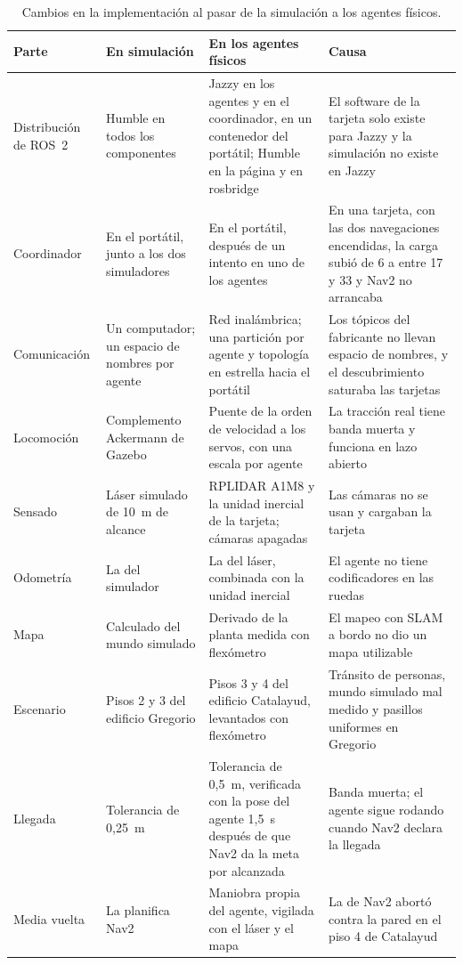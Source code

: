 \begin{table}[H]
  \centering\footnotesize
  \caption{Cambios en la implementación al pasar de la simulación a los agentes físicos.}
  \label{tab:sim-vehiculos}
  \begin{tabular}{@{}p{}p{}p{}p{}@{}}
    \toprule
    \textbf{Parte} & \textbf{En simulación} & \textbf{En los agentes físicos} & \textbf{Causa} \\ \midrule
    Distribución de ROS~2 & Humble en todos los componentes & Jazzy en los agentes y en el coordinador, en un contenedor del portátil; Humble en la página y en rosbridge & El software de la tarjeta solo existe para Jazzy y la simulación no existe en Jazzy \\ \addlinespace
    Coordinador & En el portátil, junto a los dos simuladores & En el portátil, después de un intento en uno de los agentes & En una tarjeta, con las dos navegaciones encendidas, la carga subió de 6 a entre 17 y 33 y Nav2 no arrancaba \\ \addlinespace
    Comunicación & Un computador; un espacio de nombres por agente & Red inalámbrica; una partición por agente y topología en estrella hacia el portátil & Los tópicos del fabricante no llevan espacio de nombres, y el descubrimiento saturaba las tarjetas \\ \addlinespace
    Locomoción & Complemento Ackermann de Gazebo & Puente de la orden de velocidad a los servos, con una escala por agente & La tracción real tiene banda muerta y funciona en lazo abierto \\ \addlinespace
    Sensado & Láser simulado de 10~m de alcance & RPLIDAR A1M8 y la unidad inercial de la tarjeta; cámaras apagadas & Las cámaras no se usan y cargaban la tarjeta \\ \addlinespace
    Odometría & La del simulador & La del láser, combinada con la unidad inercial & El agente no tiene codificadores en las ruedas \\ \addlinespace
    Mapa & Calculado del mundo simulado & Derivado de la planta medida con flexómetro & El mapeo con SLAM a bordo no dio un mapa utilizable \\ \addlinespace
    Escenario & Pisos 2 y 3 del edificio Gregorio & Pisos 3 y 4 del edificio Catalayud, levantados con flexómetro & Tránsito de personas, mundo simulado mal medido y pasillos uniformes en Gregorio \\ \addlinespace
    Llegada & Tolerancia de 0,25~m & Tolerancia de 0,5~m, verificada con la pose del agente 1,5~s después de que Nav2 da la meta por alcanzada & Banda muerta; el agente sigue rodando cuando Nav2 declara la llegada \\ \addlinespace
    Media vuelta & La planifica Nav2 & Maniobra propia del agente, vigilada con el láser y el mapa & La de Nav2 abortó contra la pared en el piso 4 de Catalayud \\ \bottomrule
  \end{tabular}
\end{table}

